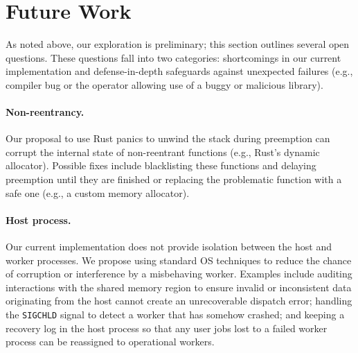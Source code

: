 \section{Future Work}
\label{sec:future}

As noted above, our exploration is preliminary; this section outlines several
open questions.  These questions fall into two categories: shortcomings in our
current implementation and defense-in-depth safeguards against unexpected
failures (e.g., compiler bug or the operator allowing use of a buggy or malicious library).


\paragraph{Non-reentrancy.}
Our proposal to use Rust panics to unwind the stack during preemption can
corrupt the internal state of non-reentrant functions (e.g., Rust's dynamic
allocator).  Possible fixes include blacklisting these functions and delaying
preemption until they are finished or replacing the problematic function with a
safe one (e.g., a custom memory allocator).

\paragraph{Host process.}
Our current implementation does not provide isolation between the host
and worker processes.  We propose using standard OS techniques to reduce
the chance of corruption or interference by a misbehaving worker.  Examples
include auditing interactions with the shared memory region to ensure invalid
or inconsistent data originating from the host cannot create an unrecoverable
dispatch error; handling the \texttt{SIGCHLD} signal to detect a worker that has
somehow crashed; and keeping a recovery log in the host process so that any
user jobs lost to a failed worker process can be reassigned to operational
workers.


